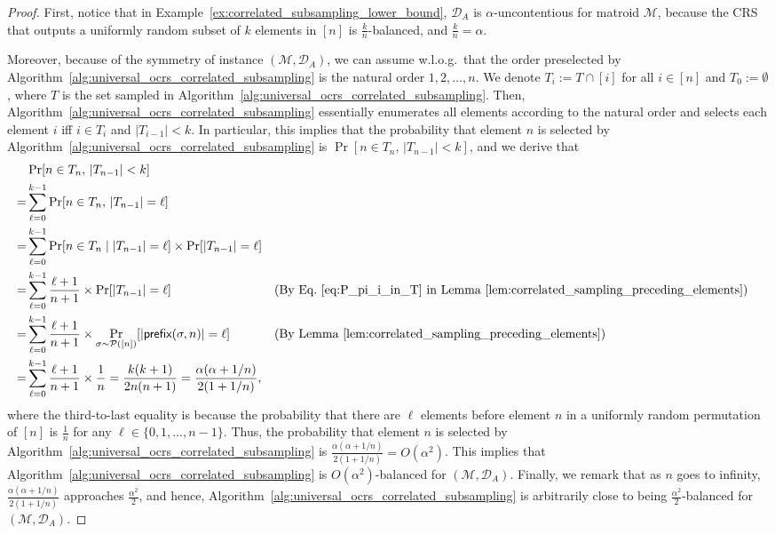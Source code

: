\documentclass[11pt]{article}
\newcommand{\D}{\mathcal D}
\newcommand{\M}{{\mathcal M}}
\newcommand{\cP}{\mathcal P}
\newcommand{\pref}{\textnormal{\sffamily prefix}}
\begin{document}
\begin{proof}
First, notice that in Example~\ref{ex:correlated_subsampling_lower_bound}, $\D_A$ is $\alpha$-uncontentious for matroid $\M$, because the CRS that outputs a uniformly random subset of $k$ elements in $[n]$ is $\frac{k}{n}$-balanced, and $\frac{k}{n}=\alpha$.

Moreover, because of the symmetry of instance $(\M,\D_A)$, we can assume w.l.o.g.~that the order preselected by Algorithm~\ref{alg:universal_ocrs_correlated_subsampling} is the natural order $1,2,\dots,n$. We denote $T_{i}:=T\cap[i]$ for all $i\in[n]$ and $T_0:=\emptyset$, where $T$ is the set sampled in Algorithm~\ref{alg:universal_ocrs_correlated_subsampling}. Then, Algorithm~\ref{alg:universal_ocrs_correlated_subsampling} essentially enumerates all elements according to the natural order and selects each element $i$ iff $i\in T_i$ and $|T_{i-1}|<k$. In particular, this implies that the probability that element $n$ is selected by Algorithm~\ref{alg:universal_ocrs_correlated_subsampling} is $\Pr[n\in T_{n},\,|T_{n-1}|<k]$, and we derive that
\begin{align*}
    &\Pr[n\in T_{n},\,|T_{n-1}|<k]\\
    =&\sum_{\ell=0}^{k-1}\Pr[n\in T_{n},\,|T_{n-1}|=\ell]\\
    =&\sum_{\ell=0}^{k-1}\Pr[n\in T_{n}\mid |T_{n-1}|=\ell]\times \Pr[|T_{n-1}|=\ell]\\
    =&\sum_{\ell=0}^{k-1}\frac{\ell+1}{n+1}\times\Pr[|T_{n-1}|=\ell] &&\text{(By Eq.~\eqref{eq:P_pi_i_in_T} in Lemma~\ref{lem:correlated_sampling_preceding_elements})}\\
    =&\sum_{\ell=0}^{k-1}\frac{\ell+1}{n+1}\times\Pr_{\sigma\sim\cP([n])}[|\pref(\sigma,n)|=\ell] &&\text{(By Lemma~\ref{lem:correlated_sampling_preceding_elements})}\\
    =&\sum_{\ell=0}^{k-1}\frac{\ell+1}{n+1}\times\frac{1}{n}=\frac{k(k+1)}{2n(n+1)}=\frac{\alpha(\alpha+1/n)}{2(1+1/n)},
\end{align*}
where the third-to-last equality is because the probability that there are $\ell$ elements before element $n$ in a uniformly random permutation of $[n]$ is $\frac{1}{n}$ for any $\ell\in\{0,1,\dots,n-1\}$. Thus, the probability that element $n$ is selected by Algorithm~\ref{alg:universal_ocrs_correlated_subsampling} is $\frac{\alpha(\alpha+1/n)}{2(1+1/n)}=O(\alpha^2)$. This implies that Algorithm~\ref{alg:universal_ocrs_correlated_subsampling} is $O(\alpha^2)$-balanced for $(\M,\D_A)$. Finally, we remark that as $n$ goes to infinity, $\frac{\alpha(\alpha+1/n)}{2(1+1/n)}$ approaches $\frac{\alpha^2}{2}$, and hence, Algorithm~\ref{alg:universal_ocrs_correlated_subsampling} is arbitrarily close to being $\frac{\alpha^2}{2}$-balanced for $(\M,\D_A)$.
\end{proof}
\end{document}
